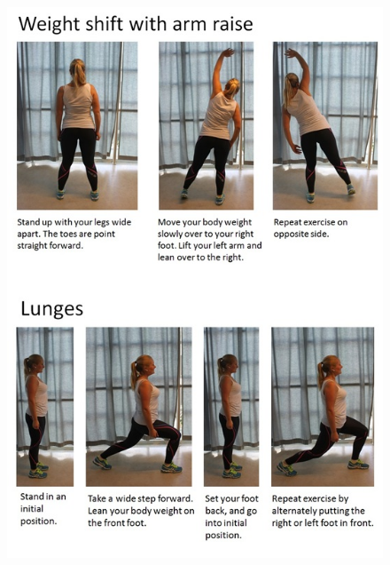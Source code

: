 \begin{figure} [ht!]
\centering
\includegraphics[scale=0.8]{WeightShift.jpg}
\label{weightshift}
\end{figure} 

